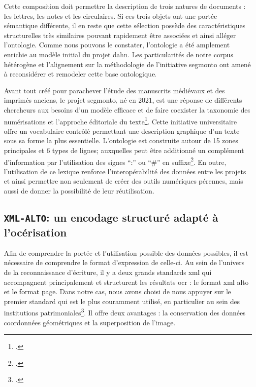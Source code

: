 	Cette composition doit permettre la description de trois natures de documents : les lettres, les notes et les circulaires. Si ces trois objets ont une portée sémantique différente, il en reste que cette sélection possède des caractéristiques structurelles très similaires pouvant rapidement être associées et ainsi alléger l'ontologie. Comme nous pouvons le constater, l'ontologie a été amplement enrichie au modèle initial du projet \gls{dahn}. Les particularités de notre corpus hétérogène et l'alignement sur la méthodologie de l'initiative \gls{segmonto} ont amené à reconsidérer et remodeler cette base ontologique.
	
	Avant tout créé pour parachever l'étude des manuscrits médiévaux et des imprimés anciens, le projet \gls{segmonto}, né en 2021, est une réponse de différents chercheurs aux besoins d'un modèle efficace et de faire coexister la taxonomie des numérisations et l'approche éditoriale du texte\footcite{gabaySegmOntoCommonVocabulary2021a}. Cette initiative universitaire offre un vocabulaire contrôlé permettant une description graphique d'un texte sous sa forme la plus essentielle. L'ontologie est construite autour de 15 zones principales et 6 types de lignes; auxquelles peut être additionné un complément d'information par l'utilisation des signes \enquote{:} ou \enquote{\#} en suffixe\footcite{gabaySegmOntoControlledVocabulary2021a}. En outre, l'utilisation de ce lexique renforce l'interopérabilité des données entre les projets et ainsi permettre non seulement de créer des outils numériques pérennes, mais aussi de donner la possibilité de leur réutilisation.
	
	\subsection{\texttt{XML-ALTO}: un encodage structuré adapté à l'océrisation}
	
	Afin de comprendre la portée et l'utilisation possible des données possibles, il est nécessaire de comprendre le format d'expression de celle-ci. Au sein de l'univers de la reconnaissance d'écriture, il y a deux grands standards \gls{xml} qui accompagnent principalement et structurent les résultats \gls{ocr} : le format \gls{xml} \gls{alto} et le format \gls{page}. Dans notre cas, nous avons choisi de nous appuyer sur le premier standard qui est le plus couramment utilisé, en particulier au sein des institutions patrimoniales\footcite[p.~74]{caronFormatsDonneesPour2021}. Il offre deux avantages : la conservation des données coordonnées géométriques et la superposition de l'image.
	
